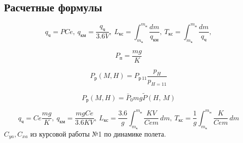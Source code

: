 \subsection{Расчетные формулы} 
\begin{equation}
\label{eq:L_T_integral}
q_{ч}=P Ce, \: q_{км}=\frac{q_{ч}}{3.6 V}, \: L_{кс}= \int_{m_к}^{m_н} \frac{dm}{q_{км}},\: T_{кс}= \int_{m_к}^{m_н} \frac{dm}{q_{ч}},
\end{equation}

\begin{equation}
\label{eq:P_potr}
P_п = \frac{mg}{K} 
\end{equation}



\begin{equation}
    P_р(M, H)= P_{р\, 11} \frac{p_H}{p_{H=11}}
\end{equation}

\begin{equation}
    P_р(M, H) = \bar{P}_0 m g \tilde{P}(H,\, M) 
\end{equation}

\[ 
q_ч = Ce \frac{mg}{K}, \: q_{км} = \frac{mg Ce}{3.6KV}, \: L_{кс}= \frac{3.6}{g}\int_{m_к}^{m_н} \frac{KV}{Ce m}
\, dm, \: T_{кс}= \frac{1}{g} \int_{m_к}^{m_н} \frac{K}{Ce m}\, dm
\]
$C_{ya}, C_{xa}$ из курсовой работы №1 по динамике полета.

